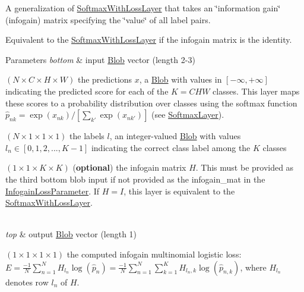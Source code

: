 A generalization of \mbox{\hyperlink{classcaffe_1_1_softmax_with_loss_layer}{Softmax\+With\+Loss\+Layer}} that takes an \char`\"{}information gain\char`\"{} (infogain) matrix specifying the \char`\"{}value\char`\"{} of all label pairs. 

Equivalent to the \mbox{\hyperlink{classcaffe_1_1_softmax_with_loss_layer}{Softmax\+With\+Loss\+Layer}} if the infogain matrix is the identity.


\begin{DoxyParams}{Parameters}
{\em bottom} & input \mbox{\hyperlink{classcaffe_1_1_blob}{Blob}} vector (length 2-\/3)
\begin{DoxyEnumerate}
\item $ (N \times C \times H \times W) $ the predictions $ x $, a \mbox{\hyperlink{classcaffe_1_1_blob}{Blob}} with values in $ [-\infty, +\infty] $ indicating the predicted score for each of the $ K = CHW $ classes. This layer maps these scores to a probability distribution over classes using the softmax function $ \hat{p}_{nk} = \exp(x_{nk}) / \left[\sum_{k'} \exp(x_{nk'})\right] $ (see \mbox{\hyperlink{classcaffe_1_1_softmax_layer}{Softmax\+Layer}}).
\item $ (N \times 1 \times 1 \times 1) $ the labels $ l $, an integer-\/valued \mbox{\hyperlink{classcaffe_1_1_blob}{Blob}} with values $ l_n \in [0, 1, 2, ..., K - 1] $ indicating the correct class label among the $ K $ classes
\item $ (1 \times 1 \times K \times K) $ ({\bfseries optional}) the infogain matrix $ H $. This must be provided as the third bottom blob input if not provided as the infogain\+\_\+mat in the \mbox{\hyperlink{classcaffe_1_1_infogain_loss_parameter}{Infogain\+Loss\+Parameter}}. If $ H = I $, this layer is equivalent to the \mbox{\hyperlink{classcaffe_1_1_softmax_with_loss_layer}{Softmax\+With\+Loss\+Layer}}. 
\end{DoxyEnumerate}\\
\hline
{\em top} & output \mbox{\hyperlink{classcaffe_1_1_blob}{Blob}} vector (length 1)
\begin{DoxyEnumerate}
\item $ (1 \times 1 \times 1 \times 1) $ the computed infogain multinomial logistic loss\+: $ E = \frac{-1}{N} \sum\limits_{n=1}^N H_{l_n} \log(\hat{p}_n) = \frac{-1}{N} \sum\limits_{n=1}^N \sum\limits_{k=1}^{K} H_{l_n,k} \log(\hat{p}_{n,k}) $, where $ H_{l_n} $ denotes row $l_n$ of $H$. 
\end{DoxyEnumerate}\\
\hline
\end{DoxyParams}


